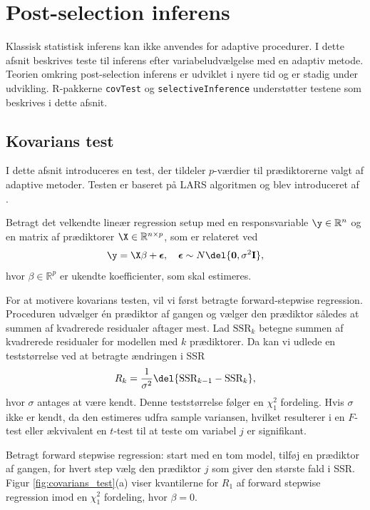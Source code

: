 \section{Post-selection inferens}
Klassisk statistisk inferens kan ikke anvendes for adaptive procedurer.
I dette afsnit beskrives teste til inferens efter variabeludvælgelse med en adaptiv metode.
Teorien omkring post-selection inferens er udviklet i nyere tid og er stadig under udvikling.
R-pakkerne \texttt{covTest} og \texttt{selectiveInference} understøtter testene som beskrives i dette afsnit.

\subsection{Kovarians test} \label{subsec:kovarians_test}
I dette afsnit introduceres en test, der tildeler \(p\)-værdier til prædiktorerne valgt af adaptive metoder.
Testen er baseret på LARS algoritmen og blev introduceret af \citep{lockhart}.

Betragt det velkendte lineær regression setup med en responsvariable \(\y \in \mathbb{R}^n\) og en matrix af prædiktorer \(\X \in \mathbb{R}^{n \times p}\), som er relateret ved
\begin{align*}
\y = \X \beta + \boldsymbol{\epsilon}, \quad \boldsymbol{\epsilon} \sim N\del{\mathbf{0}, \sigma^2 \mathbf{I}},
\end{align*}
hvor \(\beta \in \mathbb{R}^p\) er ukendte koefficienter, som skal estimeres.

For at motivere kovarians testen, vil vi først betragte forward-stepwise regression.
Proceduren udvælger én prædiktor af gangen og vælger den prædiktor således at summen af kvadrerede residualer aftager mest.
Lad \(\text{SSR}_k\) betegne summen af kvadrerede residualer for modellen med \(k\) prædiktorer.
Da kan vi udlede en teststørrelse ved at betragte ændringen i SSR
\begin{align*}
R_k = \frac{1}{\sigma^2} \del{\text{SSR}_{k-1} - \text{SSR}_k},
\end{align*}
hvor \(\sigma\) antages at være kendt. 
Denne teststørrelse følger en \(\chi_1^2\) fordeling.
Hvis \(\sigma\) ikke er kendt, da den estimeres udfra sample variansen, hvilket resulterer i en \(F\)-test eller ækvivalent en \(t\)-test til at teste om variabel \(j\) er signifikant.

Betragt forward stepwise regression: start med en tom model, tilføj en prædiktor af gangen, for hvert step vælg den prædiktor \(j\) som giver den største fald i SSR.
Figur \ref{fig:covarians_test}(a) viser kvantilerne for \(R_1\) af forward stepwise regression imod en \(\chi_1^2\) fordeling, hvor \(\beta=0\).
 

